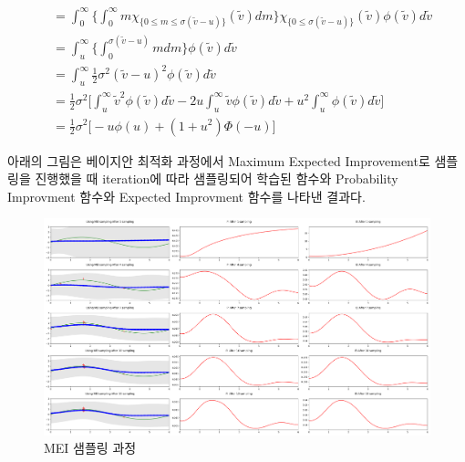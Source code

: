 \documentclass[a4paper]{oblivoir}
\begin{document}
\begin{equation}
\begin{aligned}
& = \int_{0}^{\infty} \bigg\{\int_{0}^{\infty} m\chi_{\{0 \leq m \leq \sigma(\tilde{v}-u)\}}(\tilde{v}) dm \bigg\} \chi_{\{0 \leq \sigma(\tilde{v}-u)\}}(\tilde{v}) \phi(\tilde{v})d\tilde{v}\nonumber\\
& = \int_{u}^{\infty} \bigg\{\int_{0}^{\sigma(\tilde{v}-u)} m dm \bigg\} \phi(\tilde{v})d\tilde{v}\nonumber\\
& = \int_{u}^{\infty} \frac{1}{2} \sigma^{2} (\tilde{v}-u)^{2} \phi(\tilde{v})d\tilde{v}\nonumber\\
& = \frac{1}{2} \sigma^{2} \bigg[ \int_{u}^{\infty} \tilde{v}^{2} \phi(\tilde{v})d\tilde{v} - 2u \int_{u}^{\infty} \tilde{v} \phi(\tilde{v})d\tilde{v} + u^{2} \int_{u}^{\infty}\phi(\tilde{v})d\tilde{v} \bigg]\nonumber\\
& = \frac{1}{2} \sigma^{2} \bigg[ -u \phi(u) + (1+u^{2}) \Phi(-u) \bigg]
\label{eq:12-45}
\end{aligned}
\end{equation} 

아래의 그림은 베이지안 최적화 과정에서 Maximum Expected Improvement로 샘플링을 진행했을 때 iteration에 따라 샘플링되어 학습된 함수와 Probability Improvment 함수와 Expected Improvment 함수를 나타낸 결과다.

\begin{figure}[ht]
\includegraphics[scale=0.2]{fig12_28.png} 
\caption{MEI 샘플링 과정}
\label{fig:12-21}
\end{figure}
\end{document}
